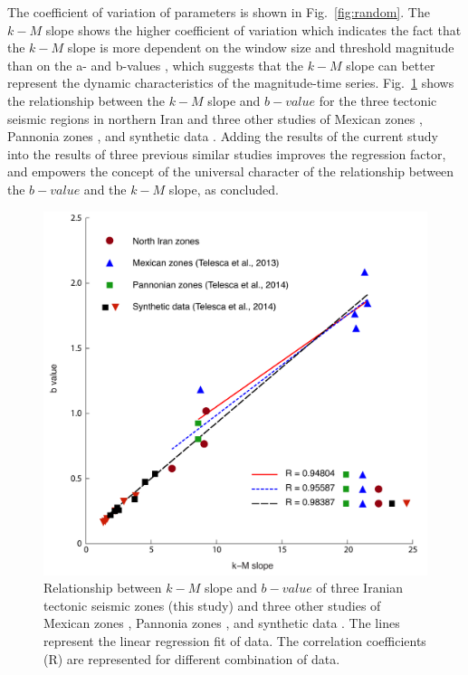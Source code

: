 \noindent
The coefficient of variation of parameters is shown in Fig.~\ref{fig:random}. The  $k-M$  slope shows the higher coefficient of variation which indicates the fact that the  $k-M$  slope is more dependent on the window size and threshold magnitude than on the a-  and  b-values , which suggests that  the $k-M$  slope can better represent the dynamic characteristics of the magnitude-time series. 
 \noindent
 Fig.~\ref{fig:regression} shows the relationship between the  $k-M$  slope and $b-value$ for the three tectonic seismic regions in northern Iran and three other studies of Mexican zones  \citep{Telesca2013}, Pannonia zones  \citep{Telesca2014}, and synthetic data \citet{Telesca2014-pone}. Adding the results of the current study into the results of three previous similar studies improves the regression factor, and empowers the concept of the universal character of the relationship between the  $b-value$  and the  $k-M$  slope, as  \citet{Telesca2014} concluded. 
 
\begin{figure} [ht]
\centering
\includegraphics[scale=0.6]{figures/pdf/Figure08.pdf} 
\caption{ Relationship between $k-M$ slope and $b-value$ of three Iranian tectonic seismic zones (this study) and three other studies of Mexican zones \citep{Telesca2013}, Pannonia zones \citep{Telesca2014}, and synthetic data \citep{Telesca2014-pone}. The lines represent the linear regression fit of data. The correlation coefficients (R) are represented for different combination of data. }
\label{fig:regression}
\end{figure}

